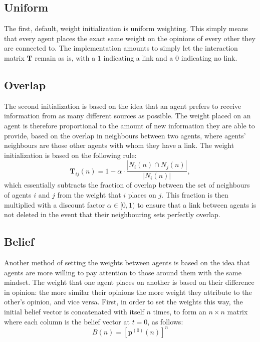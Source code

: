 \documentclass{article}
\newcommand{\T}{\textbf{T}}
\begin{document}
\subsection{Uniform}

The first, default, weight initialization is uniform weighting. This simply means that every agent places the exact same weight on the opinions of every other they are connected to. The implementation amounts to simply let the interaction matrix $\T$ remain as is, with a $1$ indicating a link and a $0$ indicating no link.

\subsection{Overlap}

The second initialization is based on the idea that an agent prefers to receive information from as many different sources as possible. The weight placed on an agent is therefore proportional to the amount of new information they are able to provide, based on the overlap in neighbours between two agents, where agents' neighbours are those other agents with whom they have a link. The weight initialization is based on the following rule:
\begin{equation}
    \T_{ij}(n) = 1 - \alpha \cdot \frac{|N_i(n) \cap N_j(n)|}{|N_i(n)|},
\end{equation}
which essentially subtracts the fraction of overlap between the set of neighbours of agents $i$ and $j$ from the weight that $i$ places on $j$. This fraction is then multiplied with a discount factor $\alpha \in [0, 1)$ to ensure that a link between agents is not deleted in the event that their neighbouring sets perfectly overlap. 

\subsection{Belief}

Another method of setting the weights between agents is based on the idea that agents are more willing to pay attention to those around them with the same mindset. The weight that one agent places on another is based on their difference in opinion: the more similar their opinions the more weight they attribute to the other's opinion, and vice versa. First, in order to set the weights this way, the initial belief vector is concatenated with itself $n$ times, to form an $n \times n$ matrix where each column is the belief vector at $t=0$, as follows:
\begin{equation}
    B(n) = [\textbf{p}^{(0)}(n)]^{n}
\end{equation}
\end{document}
